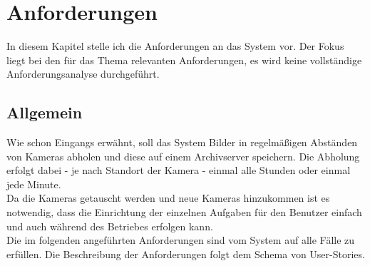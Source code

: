 \chapter{Anforderungen}\label{chap:Anforderungen}
\chapterstart
In diesem Kapitel stelle ich die Anforderungen an das System vor. Der Fokus liegt bei den für das Thema relevanten Anforderungen, es wird keine vollständige Anforderungsanalyse durchgeführt.
\section{Allgemein}
Wie schon Eingangs erwähnt, soll das System Bilder in regelmäßigen Abständen von Kameras abholen und diese auf einem Archivserver speichern. Die Abholung erfolgt dabei - je nach Standort der Kamera - einmal alle Stunden oder einmal jede Minute.\\
Da die Kameras getauscht werden und neue Kameras hinzukommen ist es notwendig, dass die Einrichtung der einzelnen Aufgaben für den Benutzer einfach und auch während des Betriebes erfolgen kann.\\
Die im folgenden angeführten Anforderungen sind vom System auf alle Fälle zu erfüllen. Die Beschreibung der Anforderungen folgt dem Schema von User-Stories.
